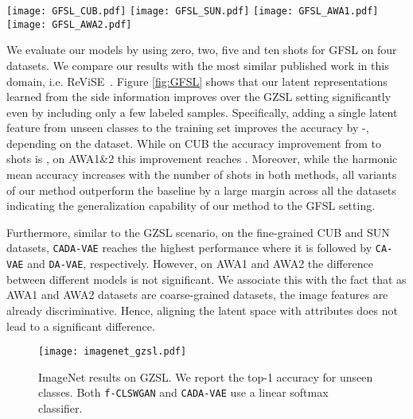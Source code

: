 \documentclass[10pt,twocolumn,letterpaper]{article}
\newcommand{\myparagraph}[1]{\vspace{6pt}\noindent{\bf #1}}
\begin{document}
\begin{figure*}[t]
    \texttt{[image: GFSL\_CUB.pdf]}
    \texttt{[image: GFSL\_SUN.pdf]}
    \texttt{[image: GFSL\_AWA1.pdf]}
    \texttt{[image: GFSL\_AWA2.pdf]}
    \vspace{-3mm}
\caption{Comparing \texttt{CA-VAE}, \texttt{DA-VAE}, \texttt{CADA-VAE} with ReViSE \cite{tsai2017improving} with increasing numbers of training samples from unseen classes, i.e. in the generalized few-shot setting.}
\label{fig:GFSL}
\end{figure*}

\myparagraph{Generalized Few-Shot Learning.}
We evaluate our models by using zero, two, five and ten shots for GFSL on four datasets. We compare our results with the most similar published work in this domain, i.e. ReViSE~\cite{tsai2017improving}. 
Figure \ref{fig:GFSL} shows that our latent representations learned from the side information improves over the GZSL setting significantly even by including only a few labeled samples. Specifically, adding a single latent feature from unseen classes to the training set improves the accuracy by -, depending on the dataset. While on CUB the accuracy improvement from  to  shots is , on AWA1\&2 this improvement reaches . Moreover, while the harmonic mean accuracy increases with the number of shots in both methods, all variants of our method outperform the baseline by a large margin across all the datasets indicating the generalization capability of our method to the GFSL setting.

Furthermore, similar to the GZSL scenario, on the fine-grained CUB and SUN datasets, \texttt{CADA-VAE} reaches the highest performance where it is followed by \texttt{CA-VAE} and \texttt{DA-VAE}, respectively. However,
on AWA1 and AWA2 the difference between different models is not significant. We associate this with the fact that as AWA1 and AWA2 datasets are coarse-grained datasets, the image features are already discriminative. Hence, aligning the latent space with attributes does not lead to a significant difference.

\begin{figure}[t]
\centering
\texttt{[image: imagenet\_gzsl.pdf]}
\caption{ImageNet results on GZSL. We report the top-1 accuracy for unseen classes. Both \texttt{f-CLSWGAN} and \texttt{CADA-VAE} use a linear softmax classifier.}
\label{fig:imagenet_results}
\end{figure}
\end{document}
